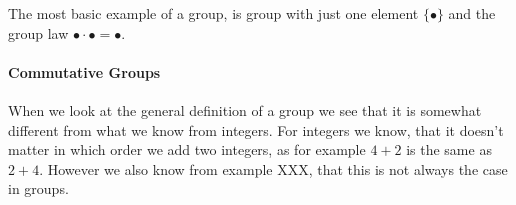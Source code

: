 \begin{example}
The most basic example of a group, is group with just one element $\{\bullet\}$ and the group law $\bullet\cdot \bullet=\bullet$.
\end{example}
\paragraph{Commutative Groups} When we look at the general definition of a group we see that it is somewhat different from what we know from integers. For integers we know, that it doesn't matter in which order we add two integers, as for example $4+2$ is the same as $2+4$. However we also know from example XXX, that this is not always the case in groups.

